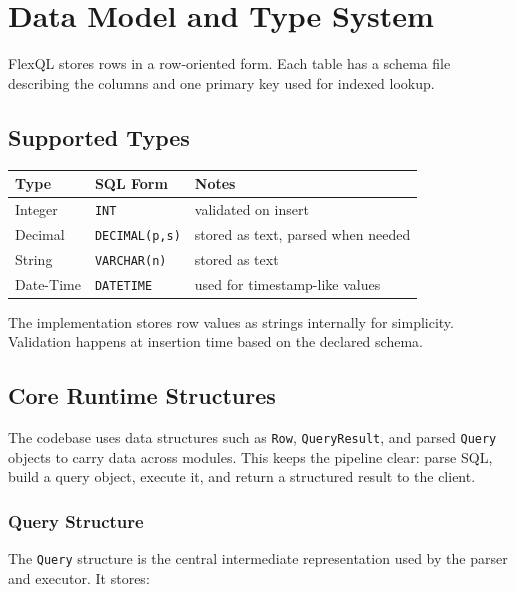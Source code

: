 \documentclass[12pt,a4paper]{article}
\begin{document}
\section{Data Model and Type System}

FlexQL stores rows in a row-oriented form. Each table has a schema file
describing the columns and one primary key used for indexed lookup.

\subsection{Supported Types}

\begin{center}
\renewcommand{\arraystretch}{1.3}
\begin{tabular}{lll}
\toprule
Type & SQL Form & Notes \\
\midrule
Integer & \texttt{INT} & validated on insert \\
Decimal & \texttt{DECIMAL(p,s)} & stored as text, parsed when needed \\
String & \texttt{VARCHAR(n)} & stored as text \\
Date-Time & \texttt{DATETIME} & used for timestamp-like values \\
\bottomrule
\end{tabular}
\end{center}

The implementation stores row values as strings internally for simplicity.
Validation happens at insertion time based on the declared schema.

\subsection{Core Runtime Structures}

The codebase uses data structures such as \texttt{Row}, \texttt{QueryResult},
and parsed \texttt{Query} objects to carry data across modules. This keeps the
pipeline clear: parse SQL, build a query object, execute it, and return a
structured result to the client.

\subsubsection{Query Structure}

The \texttt{Query} structure is the central intermediate representation used by
the parser and executor. It stores:
\end{document}
